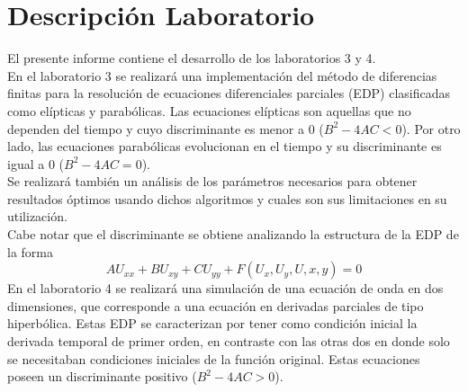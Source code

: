 \documentclass[letterpaper]{article}
\newcommand{\5}
{
\\[.5cm]
}
\begin{document}
\section{Descripción Laboratorio}
El presente informe contiene el desarrollo de los laboratorios 3 y 4. \\[0.2cm]

En el laboratorio 3 se realizará una implementación del método de diferencias finitas para la resolución de ecuaciones diferenciales parciales (EDP) clasificadas como elípticas y parabólicas. Las ecuaciones elípticas son aquellas que no dependen del tiempo y cuyo discriminante es menor a 0 ($B^2-4AC < 0$). Por otro lado, las ecuaciones parabólicas evolucionan en el tiempo y su discriminante es igual a 0 ($B^2-4AC = 0$). \\[0.2cm]

Se realizará también un análisis de los parámetros necesarios para obtener resultados óptimos usando dichos algoritmos y cuales son sus limitaciones en su utilización. \\[0.2cm]

Cabe notar que el discriminante se obtiene analizando la estructura de la EDP de la forma 
\begin{equation}
AU_{xx} + BU_{xy} + CU_{yy} + F(U_x, U_y, U, x, y) = 0
\end{equation}
En el laboratorio 4 se realizará una simulación de una ecuación de onda en dos dimensiones, que corresponde a una ecuación en derivadas parciales de tipo hiperbólica. Estas EDP se caracterizan por tener como condición inicial la derivada temporal de primer orden, en contraste con las otras dos en donde solo se necesitaban condiciones iniciales de la función original. Estas ecuaciones poseen un discriminante positivo ($B^2-4AC > 0$).

\newpage
\end{document}
